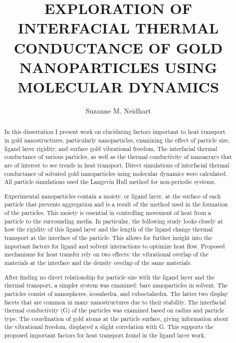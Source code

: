 \documentclass[noinfo,final,sort&compress]{nddiss2e}
\begin{document}
\frontmatter %

\title{EXPLORATION OF INTERFACIAL THERMAL CONDUCTANCE OF GOLD NANOPARTICLES USING MOLECULAR DYNAMICS}
\author{Suzanne M. Neidhart}
\maketitle


\begin{abstract}
In this dissertation I present work on elucidating factors important to heat transport in gold nanostructures, particularly nanoparticles, examining the effect of particle size, ligand layer rigidity, and surface gold vibrational freedom. The interfacial thermal conductance of various particles, as well as the thermal conductivity of nanoarrays that are of interest to see trends in heat transport.
Direct simulations of interfacial thermal conductance of solvated gold nanoparticles using molecular dynamics were calculated. All particle simulations used the Langevin Hull method for non-periodic systems.

Experimental nanoparticles contain a moiety, or ligand layer, at the surface of each particle that prevents aggregation and is a result of the method used in the formation of the particles. This moiety is essential in controlling movement of heat from a particle to the surrounding media. In particular, the following study looks closely at how the rigidity of this ligand layer and the length of the ligand change thermal transport at the interface of the particle. This allows for further insight into the important factors for ligand and solvent interactions to optimize heat flow. Proposed mechanisms for heat transfer rely on two effects: the vibrational overlap of the materials at the interface and the density overlap of the same materials.

After finding no direct relationship for particle size with the ligand layer and the thermal transport, a simpler system was examined: bare nanoparticles in solvent.
The particles consist of nanospheres, icosahedra, and cuboctahedra. The latter two display facets that are common in many nanostructures due to their stability.
The interfacial thermal conductivity (G) of the particles was examined based on radius and particle type. The coordination of gold atoms at the particle surface, giving information about the vibrational freedom, displayed a slight correlation with G. This supports the proposed important factors for heat transport found in the ligand layer work.


\end{abstract}
\end{document}

